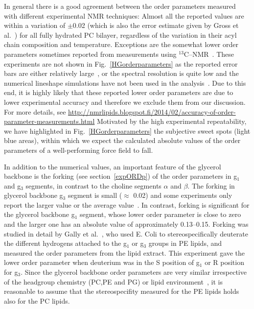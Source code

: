 \documentclass[journal=jacsat,manuscript=article]{achemso}
\begin{document}
In general there is a good agreement between the order parameters measured with different experimental NMR techniques: Almost all the 
reported values are within a variation of $\pm$0.02 (which is also the error estimate given by Gross et al.~\cite{gross97}) 
for all fully hydrated PC bilayer, regardless of the variation in their acyl chain composition and temperature.
Exceptions are the somewhat lower order parameters sometimes reported from measurements using $^{13}$C--NMR~\cite{hong95a,hong95b,warschawski05}.
These experiments are not shown in Fig.~\ref{HGorderparameters} as the reported error bars are either relatively large~\cite{hong95a,hong95b}, 
or the spectral resolution is quite low and the numerical lineshape simulations have not been used in the analysis~\cite{warschawski05}.
Due to this end, it is highly likely that these reported lower order parameters are due to lower experimental 
accuracy and therefore we exclude them from our discussion. 
For more details, see \url{http://nmrlipids.blogspot.fi/2014/02/accuracy-of-order-parameter-measurements.html}
Motivated by the high experimental repeatability, we have highlighted in 
Fig.~\ref{HGorderparameters} the subjective sweet spots (light blue areas), within which we expect the calculated absolute 
values of the order parameters of a well-performing force field to fall.


In addition to the numerical values, an important feature of the glycerol backbone is the 
forking (see section~\ref{expORDp}) of the order parameters in g$_1$ and g$_3$ segments, in contrast to the choline segments $\alpha$ and $\beta$. 
The forking in glycerol backbone g$_3$ segment is small ($\approx$ 0.02) 
and some experiments only report the larger value or the average value~\cite{akutsu81,ferreira13}. 
In contrast, forking is significant for the glycerol backbone g$_1$ segment, whose lower order parameter is close to zero and the
larger one has an absolute value of approximately 0.13--0.15. Forking was studied in detail by Gally et al.~\cite{gally81}, who used E. Coli to 
stereospecifically deuterate the different hydrogens attached to the g$_1$ or g$_3$ groups in PE lipids, and measured the order parameters from the lipid 
extract. This experiment gave the lower order parameter when deuterium was in the S position of g$_1$ or R position for g$_3$.
Since the glycerol backbone order parameters are very similar irrespective of the headgroup chemistry (PC,PE and PG) or lipid 
environment~\cite{gally81}, it is reasonable to assume that the stereospecifity measured for the PE lipids
holds also for the PC lipids.
\end{document}
